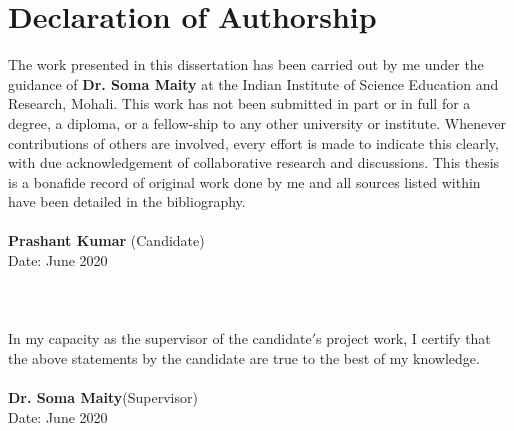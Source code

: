 \documentclass[oneside]{book}
\begin{document}
	\chapter*{Declaration of Authorship}
	The work presented in this dissertation has been carried out by me under the guidance of \textbf{Dr. Soma Maity} at the Indian Institute of Science Education and Research, Mohali.
	This work has not been submitted in part or in full for a degree, a diploma, or a fellow-ship to any other university or institute. Whenever contributions of others are involved, every effort is made to indicate this clearly, with due acknowledgement of collaborative research and discussions. This thesis is a bonafide record of original work done by me and all sources listed within have been detailed in the bibliography.\\
	\\
	\textbf{Prashant Kumar} (Candidate)\\
	Date: June 2020\\
	\\
	\\
	\\
	In my capacity as the supervisor of the candidate$'$s project work, I certify that the above statements by the candidate are true to the best of my knowledge.\\
	\\
	\textbf{Dr. Soma Maity}(Supervisor)\\
	Date: June 2020
	\thispagestyle{empty}
\end{document}
